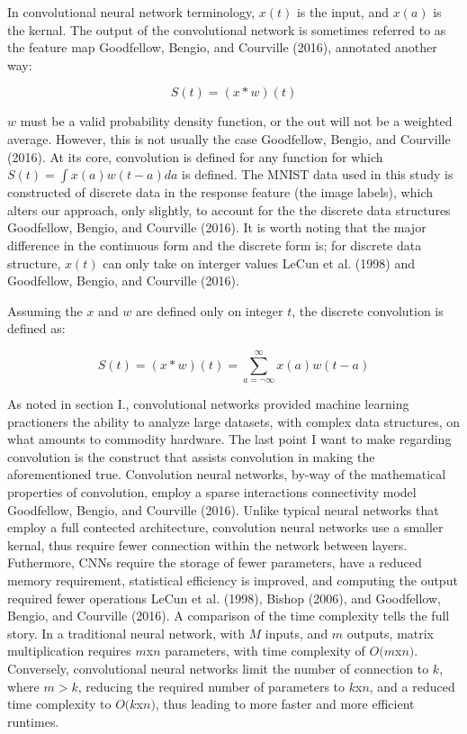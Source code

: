 \documentclass[conference,final,]{IEEEtran}
\begin{document}
In convolutional neural network terminology, \(x(t)\) is the input, and
\(x(a)\) is the kernal. The output of the convolutional network is
sometimes referred to as the feature map Goodfellow, Bengio, and
Courville (2016), annotated another way:

\begin{equation}
    S(t) =  (x*w)(t)
\end{equation}

\(w\) must be a valid probability density function, or the out will not
be a weighted average. However, this is not usually the case Goodfellow,
Bengio, and Courville (2016). At its core, convolution is defined for
any function for which \(S(t)=\int x(a)w(t-a)da\) is defined. The MNIST
data used in this study is constructed of discrete data in the response
feature (the image labels), which alters our approach, only slightly, to
account for the the discrete data structures Goodfellow, Bengio, and
Courville (2016). It is worth noting that the major difference in the
continuous form and the discrete form is; for discrete data structure,
\(x(t)\) can only take on interger values LeCun et al. (1998) and
Goodfellow, Bengio, and Courville (2016).

Assuming the \(x\) and \(w\) are defined only on integer \(t\), the
discrete convolution is defined as:

\begin{equation}
    S(t) = (x*w)(t)=\sum\limits_{a=\neg\infty}^\infty{x(a)w(t-a)}
\end{equation}

As noted in section I., convolutional networks provided machine learning
practioners the ability to analyze large datasets, with complex data
structures, on what amounts to commodity hardware. The last point I want
to make regarding convolution is the construct that assists convolution
in making the aforementioned true. Convolution neural networks, by-way
of the mathematical properties of convolution, employ a sparse
interactions connectivity model Goodfellow, Bengio, and Courville
(2016). Unlike typical neural networks that employ a full contected
architecture, convolution neural networks use a smaller kernal, thus
require fewer connection within the network between layers. Futhermore,
CNNs require the storage of fewer parameters, have a reduced memory
requirement, statistical efficiency is improved, and computing the
output required fewer operations LeCun et al. (1998), Bishop (2006), and
Goodfellow, Bengio, and Courville (2016). A comparison of the time
complexity tells the full story. In a traditional neural network, with
\(M\) inputs, and \(m\) outputs, matrix multiplication requires
\(m\)x\(n\) parameters, with time complexity of \(O(m\)x\(n)\).
Conversely, convolutional neural networks limit the number of connection
to \(k\), where \(m > k\), reducing the required number of parameters to
\(k\)x\(n\), and a reduced time complexity to \(O(k\)x\(n)\), thus
leading to more faster and more efficient runtimes.
\end{document}
